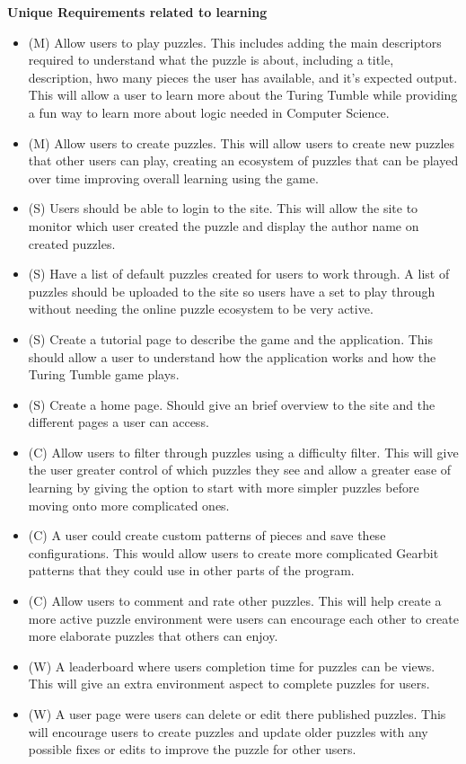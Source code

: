 \documentclass{l4proj}
\begin{document}
\textbf{Unique Requirements related to learning}
\begin{itemize}
    \item (M) Allow users to play puzzles. This includes adding the main descriptors required to understand what the puzzle is about, including a title, description, hwo many pieces the user has available, and it's expected output. This will allow a user to learn more about the Turing Tumble while providing a fun way to learn more about logic needed in Computer Science.
    \item (M) Allow users to create puzzles. This will allow users to create new puzzles that other users can play, creating an ecosystem of puzzles that can be played over time improving overall learning using the game.
    \item (S) Users should be able to login to the site. This will allow the site to monitor which user created the puzzle and display the author name on created puzzles.
    \item (S) Have a list of default puzzles created for users to work through. A list of puzzles should be uploaded to the site so users have a set to play through without needing the online puzzle ecosystem to be very active.
    \item (S) Create a tutorial page to describe the game and the application. This should allow a user to understand how the application works and how the Turing Tumble game plays.
    \item (S) Create a home page. Should give an brief overview to the site and the different pages a user can access.
    \item (C) Allow users to filter through puzzles using a difficulty filter. This will give the user greater control of which puzzles they see and allow a greater ease of learning by giving the option to start with more simpler puzzles before moving onto more complicated ones.
    \item (C) A user could create custom patterns of pieces and save these configurations. This would allow users to create more complicated Gearbit patterns that they could use in other parts of the program.
    \item (C) Allow users to comment and rate other puzzles. This will help create a more active puzzle environment were users can encourage each other to create more elaborate puzzles that others can enjoy.
    \item (W) A leaderboard where users completion time for puzzles can be views. This will give an extra environment aspect to complete puzzles for users.
    \item (W) A user page were users can delete or edit there published puzzles. This will encourage users to create puzzles and update older puzzles with any possible fixes or edits to improve the puzzle for other users.
\end{itemize}
\end{document}
